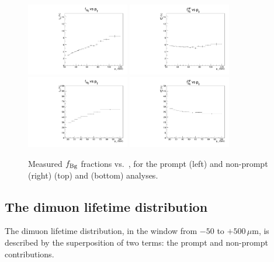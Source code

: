 \begin{figure}[h]
\centering
\includegraphics[width=0.4\textwidth]{Figures/chapter4/fBG_unc_jpsi.pdf}
\includegraphics[width=0.4\textwidth]{Figures/chapter4/fBGNP_unc_jpsi.pdf}
\includegraphics[width=0.4\textwidth]{Figures/chapter4/fBG_unc_psip.pdf}
\includegraphics[width=0.4\textwidth]{Figures/chapter4/fBGNP_unc_psip.pdf}
\caption{Measured $f_{\rm Bg}$ fractions vs.\ \pt, 
for the prompt (left) and non-prompt (right) \jpsi (top) and \psip (bottom) analyses.}
\label{fig:fBg}
\end{figure}

\vfill\newpage

\subsection{The dimuon lifetime distribution}
\label{sec:lifetime}

The dimuon lifetime distribution, 
in the window from $-50$ to $+500\,\mu$m,
is described by the superposition of two terms: 
the prompt and non-prompt contributions.

